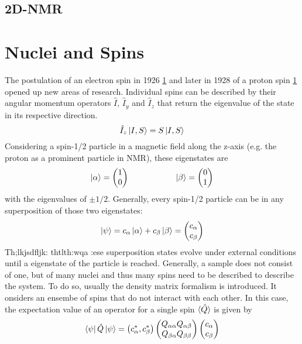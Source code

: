 		\subsection{2D-NMR}
		
	\section{Nuclei and Spins}
	The postulation of an electron spin in 1926 \ref{} and later in 1928 of a proton spin \ref{} opened
	up new areas of research.
	Individual spins can be described by their angular momentum operators $\hat{I}$,
	$\hat{I}_y$ and $\hat{I}_z$ that return the eigenvalue of the state in its respective
	direction.
	\begin{equation}
		\hat I_z \ket{I, S} = S \ket{I,S}
	\end{equation}
	Considering a spin-1/2 particle in a magnetic field along the z-axis (e.g. the proton as a prominent particle in NMR), these
	eigenstates are
	\begin{equation}
	\ket\alpha = \begin{pmatrix}1\\0\end{pmatrix} \hspace{2 cm} \ket\beta =
	\begin{pmatrix}0\\1\end{pmatrix}
	\end{equation}
	with the eigenvalues of $\pm 1/2$.
	Generally, every spin-1/2 particle can be in any superposition of those two eigenstates:
	\begin{equation}
		\ket\psi = c_\alpha \ket\alpha + c_\beta \ket \beta = \begin{pmatrix} c_\alpha \\
		c_\beta\end{pmatrix}
	\end{equation}
	Th;lkjsdfljk:
	thtlth:wqa
	:ese superposition states evolve under external conditions until a eigenstate of the particle
	is reached.
	Generally, a sample does not consist of one, but of many nuclei and thus many spins need to be
	described to describe the system. To do so, usually the density matrix formalism is introduced.
	It onsiders an ensembe of spins that do not interact with each other. In this case, the
	expectation value of an operator for a single spin $\braket{\hat Q}$ is given by
	\begin{equation}
	\bra\psi\hat Q\ket\psi = \left( c_\alpha^*, c_\beta^*\right)
	\begin{pmatrix}
		Q_{\alpha\alpha} Q_{\alpha\beta}\\
		Q_{\beta\alpha} Q_{\beta\beta}
	\end{pmatrix}
	\begin{pmatrix}
		c_\alpha\\
		c_\beta
	\end{pmatrix}
	\end{equation}
